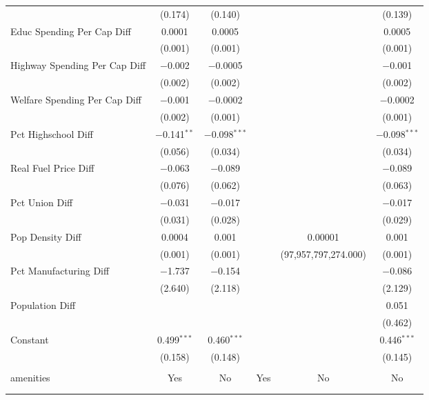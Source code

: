 \begin{table}[!htbp]
\begin{tabular}{@{\extracolsep{5pt}}lccccc}
  & (0.174) & (0.140) &  &  & (0.139) \\ 
  Educ Spending Per Cap Diff & 0.0001 & 0.0005 &  &  & 0.0005 \\ 
  & (0.001) & (0.001) &  &  & (0.001) \\ 
  Highway Spending Per Cap Diff & $-$0.002 & $-$0.0005 &  &  & $-$0.001 \\ 
  & (0.002) & (0.002) &  &  & (0.002) \\ 
  Welfare Spending Per Cap Diff & $-$0.001 & $-$0.0002 &  &  & $-$0.0002 \\ 
  & (0.002) & (0.001) &  &  & (0.001) \\ 
  Pct Highschool Diff & $-$0.141$^{**}$ & $-$0.098$^{***}$ &  &  & $-$0.098$^{***}$ \\ 
  & (0.056) & (0.034) &  &  & (0.034) \\ 
  Real Fuel Price Diff & $-$0.063 & $-$0.089 &  &  & $-$0.089 \\ 
  & (0.076) & (0.062) &  &  & (0.063) \\ 
  Pct Union Diff & $-$0.031 & $-$0.017 &  &  & $-$0.017 \\ 
  & (0.031) & (0.028) &  &  & (0.029) \\ 
  Pop Density Diff & 0.0004 & 0.001 &  & 0.00001 & 0.001 \\ 
  & (0.001) & (0.001) &  & (97,957,797,274.000) & (0.001) \\ 
  Pct Manufacturing Diff & $-$1.737 & $-$0.154 &  &  & $-$0.086 \\ 
  & (2.640) & (2.118) &  &  & (2.129) \\ 
  Population Diff &  &  &  &  & 0.051 \\ 
  &  &  &  &  & (0.462) \\ 
  Constant & 0.499$^{***}$ & 0.460$^{***}$ &  &  & 0.446$^{***}$ \\ 
  & (0.158) & (0.148) &  &  & (0.145) \\ 
 \hline \\[-1.8ex] 
amenities & Yes & No & Yes & No & No \\ 
\hline \\[-1.8ex] 
\hline 
\hline \\[-1.8ex] 
\end{tabular} 
\end{table} 
